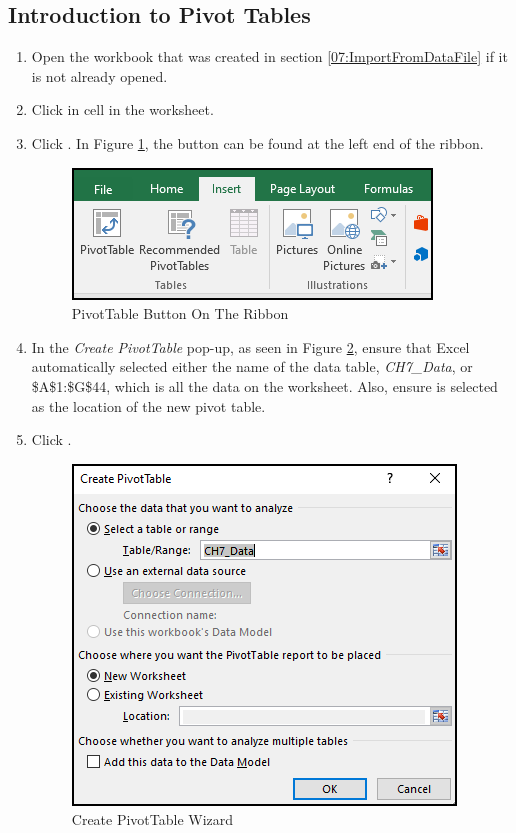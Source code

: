 \subsection{Introduction to Pivot Tables}

\begin{enumbox}
	\begin{enumerate}
		\item Open the  workbook that was created in section \ref{07:ImportFromDataFile} if it is not already opened.
		\item Click in cell  in the  worksheet.
		\item Click . In Figure \ref{07:fig11}, the  button can be found at the left end of the ribbon.

		\begin{figure}[H]
			\centering
			\includegraphics[width=\maxwidth{.75\linewidth}]{gfx/ch07_fig11}
			\caption{PivotTable Button On The Ribbon}
			\label{07:fig11}
		\end{figure}

		\item In the \textit{Create PivotTable} pop-up, as seen in Figure \ref{07:fig12}, ensure that Excel automatically selected either the name of the data table, \textit{CH7\_Data}, or \$A\$1:\$G\$44, which is all the data on the worksheet. Also, ensure  is selected as the location of the new pivot table. 
		\item Click .

		\begin{figure}[H]
			\centering
			\includegraphics[width=\maxwidth{.75\linewidth}]{gfx/ch07_fig12}
			\caption{Create PivotTable Wizard}
			\label{07:fig12}
		\end{figure}


\end{enumerate}
\end{enumbox}
